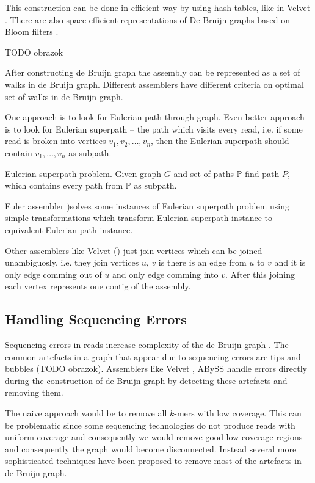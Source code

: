 This construction can be done in efficient way by using hash tables, like in Velvet \citep{Veltet}.
There are also space-efficient representations of De Bruijn graphs based on Bloom filters \citep{minia}.

TODO obrazok

After constructing de Bruijn graph the assembly can be represented
as a set of walks in de Bruijn graph. Different assemblers
have different criteria on optimal set of walks in de Bruijn graph. 

One approach is to look for Eulerian path through graph.
Even better approach is to look for
Eulerian superpath -- the path which visits every read, i.e. if some read
is broken into vertices $v_1, v_2, \dots, v_n$, then the Eulerian superpath
should contain $v_1, \dots, v_n$ as subpath.

\begin{definition}{Eulerian superpath problem.}
Given graph $G$ and set of paths $\mathbb{P}$ find path $P$, which contains
every path from $\mathbb{P}$ as subpath.
\end{definition}

Euler assembler \citep{pevzner2001eulerian})solves some instances of Eulerian superpath problem
using simple transformations which transform Eulerian superpath instance to equivalent Eulerian path instance.

Other assemblers like Velvet (\cite{Velvet}) just join vertices which can be joined
unambiguosly, i.e. they join vertices $u$, $v$ is there is an edge from $u$ to $v$ and
it is only edge comming out of $u$ and only edge comming into $v$. After this joining
each vertex represents one contig of the assembly.

\subsection{Handling Sequencing Errors}

Sequencing errors in reads increase complexity of the de Bruijn graph
\citep{pevzner2001eulerian}. The common artefacts in a graph that
appear due to sequencing errors are tips and bubbles
(TODO obrazok). Assemblers like Velvet \citep{Velvet}, ABySS \citep{Abyss} handle
errors directly during the construction of de Bruijn graph by detecting these artefacts
and removing them.

The naive approach would be to remove all $k$-mers with low coverage.
This can be problematic since some sequencing technologies do not produce reads with uniform coverage
and consequently we would remove good low coverage regions and consequently the graph would become disconnected.
Instead several more sophisticated techniques have been proposed to remove
most of the artefacts in de Bruijn graph.

